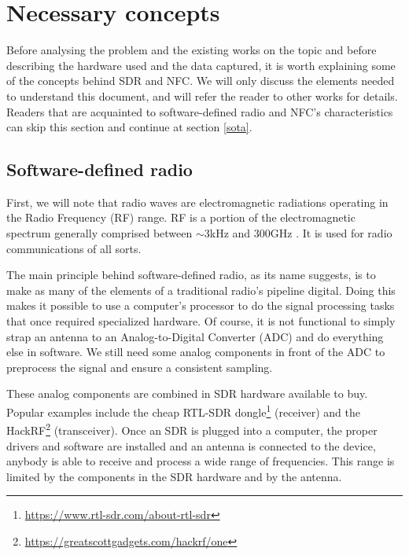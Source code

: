 \section{Necessary concepts}

Before analysing the problem and the existing works on the topic and before describing the hardware used and the data captured, it is worth explaining some of the concepts behind SDR and NFC. We will only discuss the elements needed to understand this document, and will refer the reader to other works for details. Readers that are acquainted to software-defined radio and NFC's characteristics can skip this section and continue at section \ref{sota}.

\subsection{Software-defined radio}

First, we will note that radio waves are electromagnetic radiations operating in the Radio Frequency (RF) range. RF is a portion of the electromagnetic spectrum generally comprised between $\sim$3kHz and 300GHz \cite{pritchard_elttam}. It is used for radio communications of all sorts.

The main principle behind software-defined radio, as its name suggests, is to make as many of the elements of a traditional radio's pipeline digital. Doing this makes it possible to use a computer's processor to do the signal processing tasks that once required specialized hardware. Of course, it is not functional to simply strap an antenna to an Analog-to-Digital Converter (ADC) and do everything else in software. We still need some analog components in front of the ADC to preprocess the signal and ensure a consistent sampling. \cite{wiki_software-defined_2020, hackaday_your_2015, spiess_286_2019}

These analog components are combined in SDR hardware available to buy. Popular examples include the cheap RTL-SDR dongle\footnote{\url{https://www.rtl-sdr.com/about-rtl-sdr}} (receiver) and the HackRF\footnote{\url{https://greatscottgadgets.com/hackrf/one}} (transceiver). Once an SDR is plugged into a computer, the proper drivers and software are installed and an antenna is connected to the device, anybody is able to receive and process a wide range of frequencies. This range is limited by the components in the SDR hardware and by the antenna.

